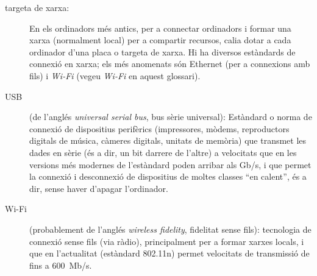 \begin{description}
\item[targeta de xarxa:] En els ordinadors més antics, per a connectar
  ordinadors i formar una xarxa (normalment local) per a compartir
  recursos, calia dotar a cada ordinador d'una placa o targeta de
  xarxa. Hi ha diversos estàndards de connexió en xarxa; els més
  anomenats són Ethernet (per a connexions amb fils) i \emph{Wi-Fi}
  (vegeu \emph{Wi-Fi} en aquest glossari).

\item[USB] (de l'anglés \emph{universal serial bus}, bus sèrie
  universal): Estàndard o norma de connexió de dispositius perifèrics
  (impressores, mòdems, reproductors digitals de música, càmeres
  digitals, unitats de memòria) que transmet les dades en sèrie (és a
  dir, un bit darrere de l'altre) a velocitats que en les versions més
  modernes de l'estàndard poden arribar als Gb/s, i que permet la
  connexió i desconnexió de dispositius de moltes classes ``en
  calent'', és a dir, sense haver d'apagar l'ordinador.

\item[Wi-Fi] (probablement de l'anglés \emph{wireless fidelity},
  fidelitat sense fils): tecnologia de connexió sense fils (via
  ràdio), principalment per a formar xarxes locals, i que en
  l'actualitat (estàndard 802.11n) permet velocitats de transmissió de
  fins a 600~Mb/s.

\end{description}


